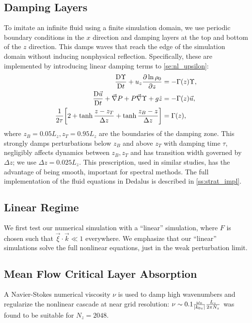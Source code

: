 \documentclass[twocolumn,
        nofootinbib, %
        usenames, %
        aps,
        prd,
        dvipsnames %
    ]{revtex4-1}%
\newcommand*{\pd}[2]{\frac{\partial#1}{\partial#2}}
\newcommand*{\md}[2]{\frac{\mathrm{D}#1}{\mathrm{D}#2}}
\DeclarePairedDelimiter\abs{\lvert}{\rvert}
\DeclarePairedDelimiter\s{\lbrack}{\rbrack}
\begin{document}
\subsection{Damping Layers}\label{ss:damping}

To imitate an infinite fluid using a finite simulation domain, we use periodic
boundary conditions in the $x$ direction and damping layers at the top and
bottom of the $z$ direction. This damps waves that reach the edge of the
simulation domain without inducing nonphysical reflection. Specifically, these
are implemented by introducing linear damping terms to \autoref{se:nl_upsilon}:
\begin{align}
    \md{\Upsilon}{t} + u_z \pd{\ln \rho_0}{z} &=
        -\Gamma(z)\Upsilon,\nonumber\\
    \md{\vec{u}}{t} + \vec{\nabla}P + P\vec{\nabla}\Upsilon + g\hat{z} &=
        - \Gamma(z)\vec{u},\nonumber\\
    \frac{1}{2\tau}\s*{2 + \tanh \frac{z - z_T}{\Delta z}
        + \tanh \frac{z_B - z}{\Delta z}} &= \Gamma(z),\label{eq:Gamma}
\end{align}
where $z_B = 0.05L_z, z_T = 0.95L_z$ are the boundaries of the damping zone.
This strongly damps perturbations below $z_B$ and above $z_T$ with damping time
$\tau$, negligibly affects dynamics between $z_B, z_T$ and has transition width
governed by $\Delta z$; we use $\Delta z = 0.025L_z$. This prescription, used in
similar studies\cite{lecoanet_damp}, has the advantage of being smooth,
important for spectral methods. The full implementation of the fluid equations
in Dedalus is described in \autoref{ss:strat_impl}.

\subsection{Linear Regime}\label{ss:lin_ns}

We first test our numerical simulation with a ``linear'' simulation, where
$F$ is chosen such that $\vec{\xi} \cdot \vec{k} \ll 1$ everywhere. We emphasize
that our ``linear'' simulations solve the full nonlinear equations, just in the
weak perturbation limit.

\subsection{Mean Flow Critical Layer Absorption}

A Navier-Stokes numerical viscosity $\nu$ is used to damp high wavenumbers and
regularize the nonlinear cascade at near grid resolution: $\nu \sim 0.1
\frac{\omega_0}{\abs*{k_{0z}}}\frac{L_z}{2\pi N_z}$ was found to be suitable for
$N_z = 2048$.
\end{document}
